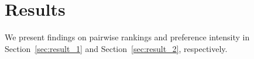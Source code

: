 \section{Results}
We present findings on pairwise rankings and preference intensity in Section~\ref{sec:result_1} and Section~\ref{sec:result_2}, respectively.


